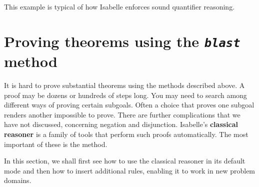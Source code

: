 This example is typical of how Isabelle enforces sound quantifier reasoning. 


\section{Proving theorems using the {\tt\slshape blast} method}

It is hard to prove substantial theorems using the methods 
described above. A proof may be dozens or hundreds of steps long.  You 
may need to search among different ways of proving certain 
subgoals. Often a choice that proves one subgoal renders another 
impossible to prove.  There are further complications that we have not
discussed, concerning negation and disjunction.  Isabelle's
\textbf{classical reasoner} is a family of tools that perform such
proofs automatically.  The most important of these is the 
{} method. 

In this section, we shall first see how to use the classical 
reasoner in its default mode and then how to insert additional 
rules, enabling it to work in new problem domains. 

